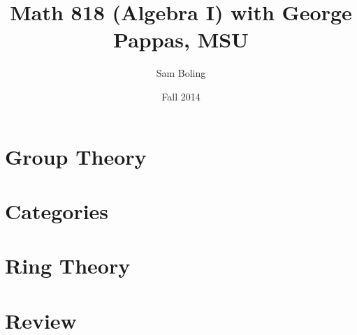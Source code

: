 \documentclass{report}
\title{Math 818 (Algebra I) with George Pappas, MSU}
\author{Sam Boling}
\date{Fall 2014}
\begin{document}
\maketitle

\chapter{Group Theory}








\chapter{Categories}


\chapter{Ring Theory}



\chapter{Review}

\end{document}
